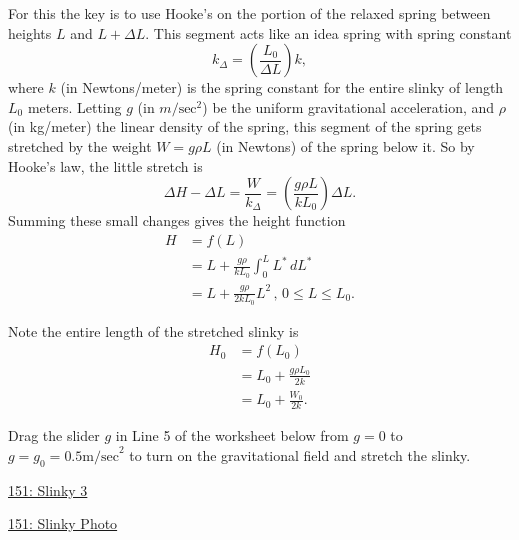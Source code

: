 \documentclass{ximera}
\begin{document}
For this the key is to use Hooke's on the portion of the relaxed spring between heights $L$ and $L+\Delta L$. This segment acts like an idea spring with spring constant
\[
        k_\Delta  =  \left( \frac{L_0}{\Delta L} \right) k,   
\]
where $k$ (in Newtons/meter) is the spring constant for the entire slinky of length $L_0$ meters. Letting $g$ (in $m/\text{sec}^2$) be the uniform gravitational acceleration, and $\rho$ (in kg/meter) the linear density of the spring, this segment of the spring gets stretched by the weight $W =g \rho L$ (in Newtons) of the spring below it. So by Hooke's law, the little stretch is
\[
     \Delta H - \Delta L =  \frac{W}{k_\Delta} = \left( \frac{g\rho L}{k L_0} \right) \Delta L .
\]
Summing these small changes gives the height function
\begin{align*}
    H &= f(L)   \\
        &= L +  \frac{g\rho}{k L_0} \int_0^L L^* \, dL^* \\
         & = L + \frac{g\rho}{2kL_0}L^2 \, , \, 0\leq L \leq L_0 .
\end{align*}

Note the entire length of the stretched slinky is
\begin{align*}
   H_0 &= f(L_0)  \\
          &= L_0 + \frac{g\rho L_0}{2k} \\
          &= L_0 +  \frac{W_0}{2k}  .
\end{align*}


Drag the slider $g$ in Line 5 of the worksheet below from $g=0$ to $g=g_0 = 0.5 \text{m/sec}^2$ to turn on the gravitational field and stretch the slinky. 

\begin{onlineOnly}
    \begin{center}
\end{center}
\end{onlineOnly}

\href{https://www.desmos.com/calculator/vjjibjkdrz}{151: Slinky 3}


\begin{onlineOnly}
    \begin{center}
\end{center}
\end{onlineOnly}

\href{https://www.desmos.com/calculator/zqjjgael5j}{151: Slinky Photo}
\end{document}
